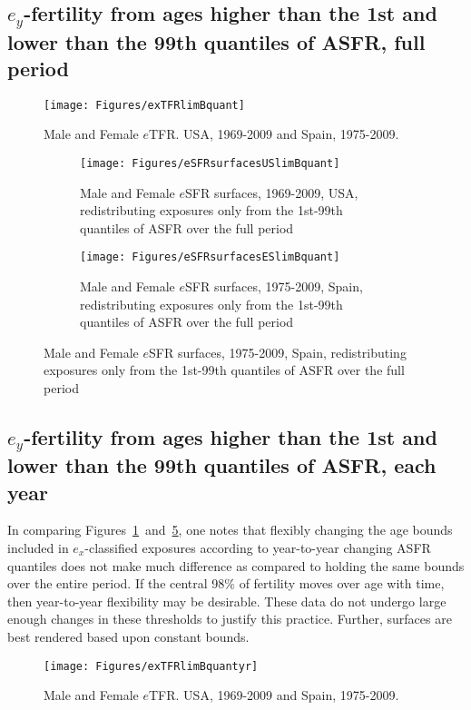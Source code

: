  \FloatBarrier
\subsection{$e_y$-fertility from ages higher than the 1st and lower than the
99th quantiles of ASFR, full period}

\begin{figure}[ht!]
        \centering  
          \caption{Male and Female $e$TFR. USA, 1969-2009 and Spain, 1975-2009.}
           \texttt{[image: Figures/exTFRlimBquant]}
          \label{fig:exTFRlimBquant}
\end{figure}

\label{sec:quant}
\begin{figure}[ht!]
        \centering
        \begin{subfigure}
                \centering
                \caption{Male and Female $e$SFR surfaces, 1969-2009, USA,
                redistributing exposures only from the 1st-99th quantiles of
                ASFR over the full period}
                \texttt{[image: Figures/eSFRsurfacesUSlimBquant]}
                \label{fig:exSFRsurfUSlimBquant}
        \end{subfigure}
        \begin{subfigure}
                \centering
                \caption{Male and Female $e$SFR surfaces, 1975-2009, Spain,
                redistributing exposures only from the 1st-99th quantiles of
                ASFR over the full period}
                \texttt{[image: Figures/eSFRsurfacesESlimBquant]} 
                \label{fig:exSFRsurfESlimBquant}
        \end{subfigure}
\end{figure}

 \FloatBarrier
\subsection{$e_y$-fertility from ages higher than the 1st and lower than the
99th quantiles of ASFR, each year}
\label{sec:quantan}
In comparing Figures~\ref{fig:exTFRlimBquant}~and~\ref{fig:exTFRlimBquantyr},
one notes that flexibly changing the age bounds included in $e_x$-classified
exposures according to year-to-year changing ASFR quantiles does not make much
difference as compared to holding the same bounds over the entire period. If
the central 98\% of fertility moves over age with time, then year-to-year
flexibility may be desirable. These data do not undergo large enough changes in
these thresholds to justify this practice. Further, surfaces are best rendered
based upon constant bounds.

 \begin{figure}[ht!]
        \centering  
          \caption{Male and Female $e$TFR. USA, 1969-2009 and Spain, 1975-2009.}
           \texttt{[image: Figures/exTFRlimBquantyr]}
          \label{fig:exTFRlimBquantyr}
\end{figure}
